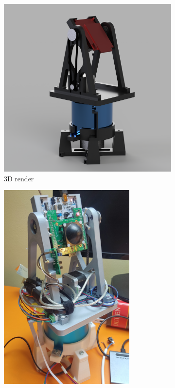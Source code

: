 \begin{figure}[h!]
  \centering
  \begin{subfigure}[b]{0.45\textwidth}
    \centering
    \includegraphics[width=\textwidth]{../img/whole_assembly_2.png} %
    \caption{3D render}
  \end{subfigure}
  \hspace{0.05\textwidth} %
  \begin{subfigure}[b]{0.45\textwidth}
    \centering
    \includegraphics[width=0.75\textwidth]{../img/assembly_photo.jpg} %

\end{subfigure}
\end{figure}

